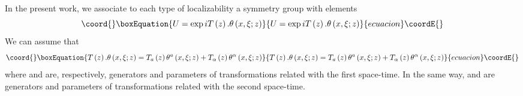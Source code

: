 \documentclass[12pt,a4paper]{article}
\begin{document}
In the present work, we associate to each type of localizability \coordHE{} a
symmetry group \coordHE{} with elements
\begin{equation}\coord{}\boxEquation{
U=\exp iT\left(  z\right)  .\theta\left(  x,\xi;z\right)
}{
U=\exp iT\left(  z\right)  .\theta\left(  x,\xi;z\right)
}{ecuacion}\coordE{}\end{equation}
We can assume that
\begin{equation}\coord{}\boxEquation{
T\left(  z\right)  .\theta\left(  x,\xi;z\right)  =T_{a}\left(  z\right)
\theta^{a}\left(  x,\xi;z\right)  +T_{\alpha}\left(  z\right)  \theta^{\alpha
}\left(  x,\xi;z\right)
}{
T\left(  z\right)  .\theta\left(  x,\xi;z\right)  =T_{a}\left(  z\right)
\theta^{a}\left(  x,\xi;z\right)  +T_{\alpha}\left(  z\right)  \theta^{\alpha
}\left(  x,\xi;z\right)
}{ecuacion}\coordE{}\end{equation}
where \coordHE{} and \coordHE{} are, respectively, generators and parameters of
transformations related with the first space-time. In the same way,
\coordHE{} and \myHighlight{$\theta^{\alpha}$}\coordHE{} are generators and parameters of
transformations related with the second space-time.
\end{document}
